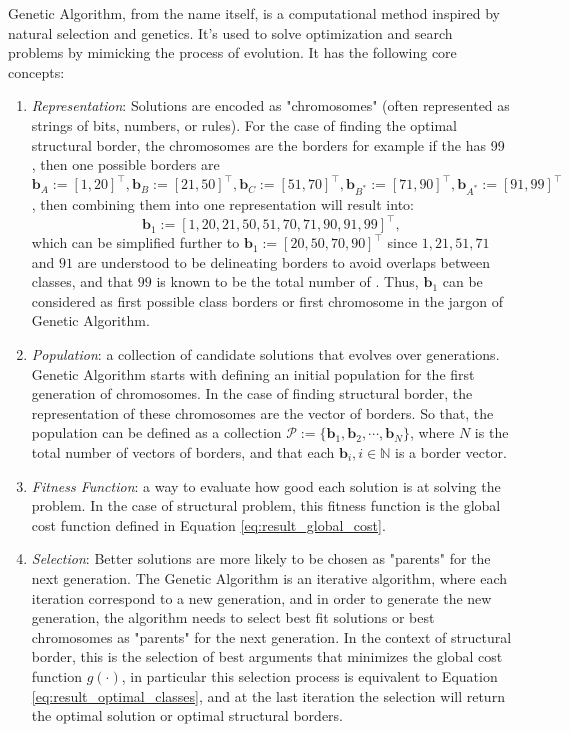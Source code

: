 Genetic Algorithm, from the name itself, is a computational method inspired by natural selection and genetics. It's used to solve optimization and search problems by mimicking the process of evolution. It has the following core concepts: 
\begin{enumerate}
    \item \textit{Representation}: Solutions are encoded as "chromosomes" (often represented as strings of bits, numbers, or rules). For the case of finding the optimal structural border, the chromosomes are the borders for example if the   has 99  , then one possible borders are $\mathbf{b}_A:=[1, 20]^{\top}, \mathbf{b}_B:=[21,50]^{\top}, \mathbf{b}_C:=[51,70]^{\top}, \mathbf{b}_{B^*}:=[71,90]^{\top}, \mathbf{b}_{A^*}:=[91,99]^{\top}$, then combining them into one representation will result into:
    \begin{equation}
        \mathbf{b}_{1}:=[1,20,21,50,51,70,71,90,91,99]^{\top},
    \end{equation}
    which can be simplified further to $\mathbf{b}_1:=[20,50,70,90]^{\top}$ since $1, 21,51,71$ and $91$ are understood to be delineating borders to avoid overlaps between classes, and that $99$ is known to be the total number of  . Thus, $\mathbf{b}_1$ can be considered as first possible class borders or first chromosome in the jargon of Genetic Algorithm.
    \item \textit{Population}: a collection of candidate solutions that evolves over generations. Genetic Algorithm starts with defining an initial population for the first generation of chromosomes. In the case of finding structural border, the representation of these chromosomes are the vector of borders. So that, the population can be defined as a collection $\mathscr{P}:=\{\mathbf{b}_1,\mathbf{b}_2,\cdots,\mathbf{b}_N\}$, where $N$ is the total number of vectors of borders, and that each $\mathbf{b}_i,i\in\mathbb{N}$ is a border vector.
    \item \textit{Fitness Function}: a way to evaluate how good each solution is at solving the problem. In the case of structural problem, this fitness function is the global cost function defined in Equation \ref{eq:result_global_cost}.
    \item \textit{Selection}: Better solutions are more likely to be chosen as "parents" for the next generation. The Genetic Algorithm is an iterative algorithm, where each iteration correspond to a new generation, and in order to generate the new generation, the algorithm needs to select best fit solutions or best chromosomes as "parents" for the next generation. In the context of structural border, this is the selection of best arguments that minimizes the global cost function $g(\cdot)$, in particular this selection process is equivalent to Equation \ref{eq:result_optimal_classes}, and at the last iteration the selection will return the optimal solution or optimal structural borders.

\end{enumerate}
